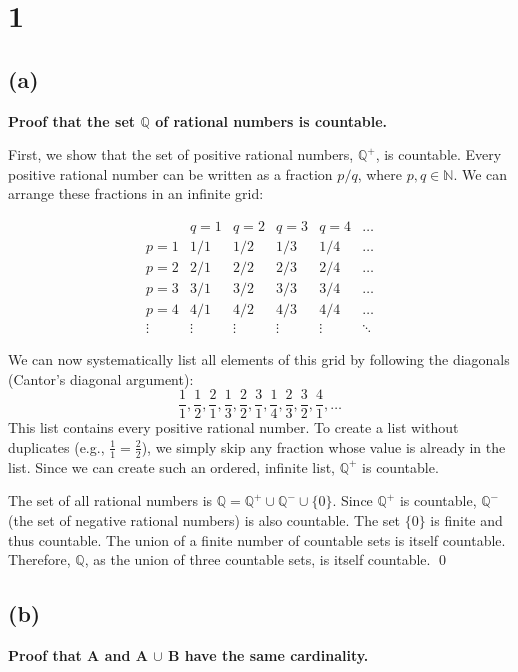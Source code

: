 \documentclass[12pt,a4paper]{article}
\theoremstyle{definition}
\theoremstyle{remark}
\begin{document}
\section*{1}

\subsection*{(a)}
\textbf{Proof that the set $\mathbb{Q}$ of rational numbers is countable.}

First, we show that the set of positive rational numbers, $\mathbb{Q}^+$, is countable. Every positive rational number can be written as a fraction $p/q$, where $p, q \in \mathbb{N}$. We can arrange these fractions in an infinite grid:

\[
\begin{array}{c|ccccc}
  & q=1 & q=2 & q=3 & q=4 & \dots \\
\hline
p=1 & 1/1 & 1/2 & 1/3 & 1/4 & \dots \\
p=2 & 2/1 & 2/2 & 2/3 & 2/4 & \dots \\
p=3 & 3/1 & 3/2 & 3/3 & 3/4 & \dots \\
p=4 & 4/1 & 4/2 & 4/3 & 4/4 & \dots \\
\vdots & \vdots & \vdots & \vdots & \vdots & \ddots
\end{array}
\]

We can now systematically list all elements of this grid by following the diagonals (Cantor's diagonal argument):
\[
\frac{1}{1}, \frac{1}{2}, \frac{2}{1}, \frac{1}{3}, \frac{2}{2}, \frac{3}{1}, \frac{1}{4}, \frac{2}{3}, \frac{3}{2}, \frac{4}{1}, \dots
\]
This list contains every positive rational number. To create a list without duplicates (e.g., $\frac{1}{1} = \frac{2}{2}$), we simply skip any fraction whose value is already in the list. Since we can create such an ordered, infinite list, $\mathbb{Q}^+$ is countable.

The set of all rational numbers is $\mathbb{Q} = \mathbb{Q}^+ \cup \mathbb{Q}^- \cup \{0\}$.
Since $\mathbb{Q}^+$ is countable, $\mathbb{Q}^-$ (the set of negative rational numbers) is also countable. The set $\{0\}$ is finite and thus countable.
The union of a finite number of countable sets is itself countable. Therefore, $\mathbb{Q}$, as the union of three countable sets, is itself countable. \qed

\subsection*{(b)}
\textbf{Proof that A and A $\cup$ B have the same cardinality.}
\end{document}
